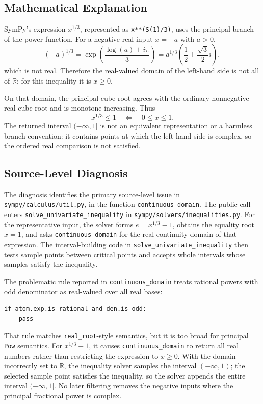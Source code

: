 \documentclass[11pt]{article}
\begin{document}
\subsection{Mathematical Explanation}

SymPy's expression \(x^{1/3}\), represented as \verb|x**(S(1)/3)|, uses the
principal branch of the power function. For a negative real input \(x=-a\) with
\(a>0\),
\[
    (-a)^{1/3}
      = \exp\!\left(\frac{\log(a)+i\pi}{3}\right)
      = a^{1/3}\left(\frac{1}{2} + \frac{\sqrt{3}}{2}i\right),
\]
which is not real. Therefore the real-valued domain of the left-hand side is not
all of \(\mathbb{R}\); for this inequality it is \(x \geq 0\).

On that domain, the principal cube root agrees with the ordinary nonnegative
real cube root and is monotone increasing. Thus
\[
    x^{1/3} \leq 1
    \quad\Longleftrightarrow\quad
    0 \leq x \leq 1.
\]
The returned interval \((-\infty,1]\) is not an equivalent representation or a
harmless branch convention: it contains points at which the left-hand side is
complex, so the ordered real comparison is not satisfied.

\subsection{Source-Level Diagnosis}

The diagnosis identifies the primary source-level issue in
\nolinkurl{sympy/calculus/util.py}, in the function \texttt{continuous\_domain}.
The public call enters \texttt{solve\_univariate\_inequality} in
\nolinkurl{sympy/solvers/inequalities.py}. For the representative input, the
solver forms \(e=x^{1/3}-1\), obtains the equality root \(x=1\), and asks
\texttt{continuous\_domain} for the real continuity domain of that expression.
The interval-building code in \texttt{solve\_univariate\_inequality} then tests
sample points between critical points and accepts whole intervals whose samples
satisfy the inequality.

The problematic rule reported in \texttt{continuous\_domain} treats rational
powers with odd denominator as real-valued over all real bases:

\begin{lstlisting}[style=bugpython]
if atom.exp.is_rational and den.is_odd:
    pass
\end{lstlisting}

That rule matches \texttt{real\_root}-style semantics, but it is too broad for
principal \texttt{Pow} semantics. For \(x^{1/3}-1\), it causes
\texttt{continuous\_domain} to return all real numbers rather than restricting
the expression to \(x \geq 0\). With the domain incorrectly set to
\(\mathbb{R}\), the inequality solver samples the interval \((-\infty,1)\);
the selected sample point satisfies the inequality, so the solver appends the
entire interval \((-\infty,1]\). No later filtering removes the negative inputs
where the principal fractional power is complex.
\end{document}

